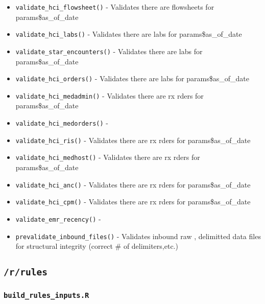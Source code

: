 \documentclass[
]{book}
\begin{document}
\begin{itemize}
\item
  \texttt{validate\_hci\_flowsheet()} - Validates there are flowsheets for params\$as\_of\_date
\item
  \texttt{validate\_hci\_labs()} - Validates there are labs for params\$as\_of\_date
\item
  \texttt{validate\_star\_encounters()} - Validates there are labs for params\$as\_of\_date
\item
  \texttt{validate\_hci\_orders()} - Validates there are labs for params\$as\_of\_date
\item
  \texttt{validate\_hci\_medadmin()} - Validates there are rx rders for params\$as\_of\_date
\item
  \texttt{validate\_hci\_medorders()} -
\item
  \texttt{validate\_hci\_ris()} - Validates there are rx rders for params\$as\_of\_date
\item
  \texttt{validate\_hci\_medhost()} - Validates there are rx rders for params\$as\_of\_date
\item
  \texttt{validate\_hci\_anc()} - Validates there are rx rders for params\$as\_of\_date
\item
  \texttt{validate\_hci\_cpm()} - Validates there are rx rders for params\$as\_of\_date
\item
  \texttt{validate\_emr\_recency()} -
\item
  \texttt{prevalidate\_inbound\_files()} - Validates inbound raw , delimitted data files for structural integrity (correct \# of delimiters,etc.)
\end{itemize}

\hypertarget{rrules-1}{%
\subsection{\texorpdfstring{\texttt{/r/rules}}{/r/rules}}\label{rrules-1}}

\hypertarget{build_rules_inputs.r}{%
\subsubsection{\texorpdfstring{\texttt{build\_rules\_inputs.R}}{build\_rules\_inputs.R}}\label{build_rules_inputs.r}}
\end{document}
